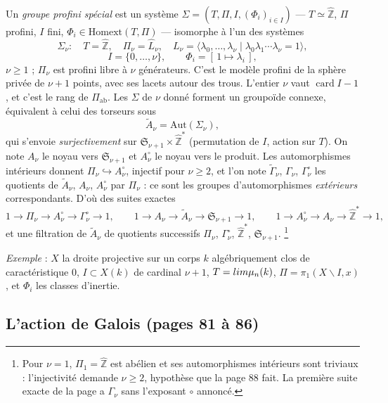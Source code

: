 \documentclass[11pt,a4paper]{article}
\begin{document}
Un \emph{groupe profini spécial} est un système $\Sigma = (T, \Pi, I,
(\Phi_{i})_{i \in I})$ --- $T \simeq \widehat{\mathbb{Z}}$, $\Pi$ profini, $I$
fini, $\Phi_{i} \in \mathrm{Homext}(T, \Pi)$ --- isomorphe à l'un des systèmes
\[
\Sigma_{\nu} : \quad T = \widehat{\mathbb{Z}}, \quad \Pi_{\nu} = \widehat{L}_{\nu},
\quad L_{\nu} = \langle \lambda_{0}, \ldots, \lambda_{\nu} \mid \lambda_{0}\lambda_{1}
\cdots \lambda_{\nu} = 1 \rangle,
\]
\[
I = \{0, \ldots, \nu\}, \qquad \Phi_{i} = [\,1 \mapsto \lambda_{i}\,],
\]
$\nu \geqslant 1$ ; $\Pi_{\nu}$ est profini libre à $\nu$ générateurs. C'est le
modèle profini de la sphère privée de $\nu + 1$ points, avec ses lacets
autour des trous. L'entier $\nu$ vaut $\operatorname{card} I - 1$, et c'est le
rang de $\Pi_{\mathrm{ab}}$. Les $\Sigma$ de $\nu$ donné forment un groupoïde
connexe, équivalent à celui des torseurs sous
\[
\widetilde{A}_{\nu} = \mathrm{Aut}(\Sigma_{\nu}),
\]
qui s'envoie \emph{surjectivement} sur $\mathfrak{S}_{\nu+1} \times
\widehat{\mathbb{Z}}^{*}$ (permutation de $I$, action sur $T$). On note $A_{\nu}$
le noyau vers $\mathfrak{S}_{\nu+1}$ et $A^{\circ}_{\nu}$ le noyau vers le produit.
Les automorphismes intérieurs donnent $\Pi_{\nu} \hookrightarrow A^{\circ}_{\nu}$,
injectif pour $\nu \geqslant 2$, et l'on note $\widetilde{\Gamma}_{\nu}$,
$\Gamma_{\nu}$, $\Gamma^{\circ}_{\nu}$ les quotients de $\widetilde{A}_{\nu}$,
$A_{\nu}$, $A^{\circ}_{\nu}$ par $\Pi_{\nu}$ : ce sont les groupes d'automorphismes
\emph{extérieurs} correspondants. D'où des suites exactes
\[
1 \to \Pi_{\nu} \to A^{\circ}_{\nu} \to \Gamma^{\circ}_{\nu} \to 1, \qquad
1 \to A_{\nu} \to \widetilde{A}_{\nu} \to \mathfrak{S}_{\nu+1} \to 1, \qquad
1 \to A^{\circ}_{\nu} \to A_{\nu} \to \widehat{\mathbb{Z}}^{*} \to 1,
\]
et une filtration de $\widetilde{A}_{\nu}$ de quotients successifs $\Pi_{\nu}$,
$\Gamma^{\circ}_{\nu}$, $\widehat{\mathbb{Z}}^{*}$, $\mathfrak{S}_{\nu+1}$.%
\footnote{Pour $\nu = 1$, $\Pi_{1} = \widehat{\mathbb{Z}}$ est abélien et ses
automorphismes intérieurs sont triviaux : l'injectivité demande $\nu
\geqslant 2$, hypothèse que la page 88 fait. La première suite exacte de la
page a $\Gamma_{\nu}$ sans l'exposant $\circ$ annoncé.}

\emph{Exemple} : $X$ la droite projective sur un corps $k$ algébriquement clos
de caractéristique $0$, $I \subset X(k)$ de cardinal $\nu + 1$, $T = \varprojlim
\mu_{n}(k)$, $\Pi = \pi_{1}(X \smallsetminus I, x)$, et $\Phi_{i}$ les classes
d'inertie.

\subsection*{L'action de Galois (pages 81 à 86)}
\end{document}
